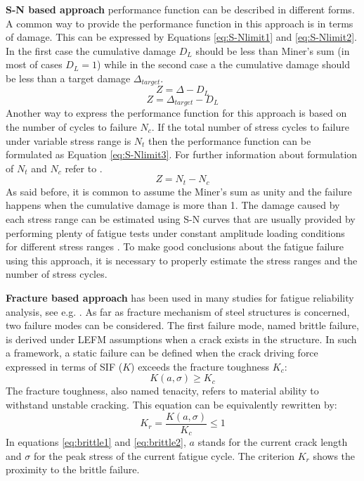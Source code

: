 \noindent
\textbf{S-N based approach} performance function can be described in different forms. A common way to provide the performance function in this approach is in terms of damage. This can be expressed
by Equations \ref{eq:S-Nlimit1} and \ref{eq:S-Nlimit2}. In the first case the cumulative damage $D_L$ should be less than Miner's sum (in most of cases $D_L=1$) while in the second case a the 
cumulative damage should be less than a target damage $\Delta_{target}$. 
\begin{equation}
 Z = \Delta -D_L 
 \label{eq:S-Nlimit1}
\end{equation}
\begin{equation}
 Z = \Delta_{target} -D_L
 \label{eq:S-Nlimit2}
\end{equation}
\noindent
Another way to express the performance function for this approach is based on the number of cycles to failure $N_c$. If the total number of stress cycles to failure under variable stress range is $N_t$ 
then the performance function can be formulated as Equation \ref{eq:S-Nlimit3}. For further information about formulation of $N_t$ and $N_c$ refer to \citep{LIU201077}.
\begin{equation}
 Z = N_t - N_c 
 \label{eq:S-Nlimit3}
\end{equation}
\noindent
As said before, it is common to assume the Miner's sum as unity and the failure happens when the cumulative damage is more than 1. The damage caused by each stress range can be estimated using S-N 
curves that are usually provided by performing plenty of fatigue tests under constant amplitude loading conditions for different stress ranges \citep{SZERSZEN199983}. To make good conclusions about 
the fatigue failure using this approach, it is necessary to properly estimate the stress ranges and the number of stress cycles. 

\noindent
\textbf{Fracture based approach} has been used in many studies for fatigue reliability analysis, see e.g. \citet{Park2005, Ye2014}. 
As far as fracture mechanism of steel structures is concerned, two failure modes can be considered. The first failure mode, named brittle failure, is derived under LEFM assumptions when a crack exists in
the structure. In such a framework, a static failure can be defined when the crack driving force expressed in terms of SIF ($K$) exceeds the fracture toughness $K_c$: 
\begin{equation}
K(a, \sigma) \geq K_c
 \label{eq:brittle1}
\end{equation}
The fracture toughness, also named tenacity, refers to material ability to withstand unstable cracking. This equation can be equivalently rewritten by: 
\begin{equation}
 K_r=\frac{K(a, \sigma)}{K_c} \leq 1
 \label{eq:brittle2}
\end{equation}
In equations \ref{eq:brittle1} and \ref{eq:brittle2}, $a$ stands for the current crack length and $\sigma$ for the peak stress of the current fatigue cycle. The criterion $K_r$ shows the proximity 
to the brittle failure. 

